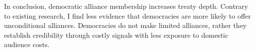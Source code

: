 \documentclass[12pt]{article}
\begin{document}
In conclusion, democratic alliance membership increases treaty depth. 
Contrary to existing research, I find less evidence that democracies are more likely to offer unconditional alliances. 
Democracies do not make limited alliances, rather they establish credibility through costly signals with less exposure to domestic audience costs. 



\singlespace
 
 
\end{document}
